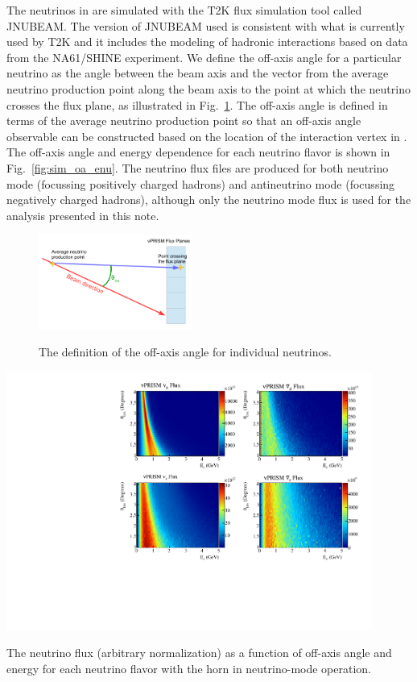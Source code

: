 The neutrinos in \nuprism are simulated with the T2K flux simulation tool called JNUBEAM.  The version of JNUBEAM used is consistent with what is currently used by T2K and it includes the modeling of hadronic interactions based on data from the NA61/SHINE experiment.  We define the off-axis angle for a particular neutrino as the angle between 
the beam axis and the vector from the average neutrino production point along the beam axis to the point
at which the neutrino crosses the flux plane, as illustrated in Fig.~\ref{fig:oa_def}.  The off-axis angle
is defined in terms of the average neutrino production point so that an off-axis angle observable can be
constructed based on the location of the interaction vertex in \nuprism.  The off-axis angle and energy 
dependence for each neutrino flavor is shown in Fig.~\ref{fig:sim_oa_enu}.  The neutrino flux files are produced
for both neutrino mode (focussing positively charged hadrons) and antineutrino mode (focussing negatively 
charged hadrons), although only the neutrino mode flux is used for the analysis presented in this note. 

\begin {figure}[htp]
  \begin{center}
    \includegraphics[width=0.45\textwidth]{figures/oa_definition.pdf}
    \caption{The definition of the off-axis angle for individual neutrinos.}
    \label{fig:oa_def}
  \end{center}
\end {figure}     

\begin {figure*}[htp]
  \begin{center}
    \includegraphics[width=0.9\textwidth]{figures/nuprism_oa_enu.pdf}
    \caption{The neutrino flux (arbitrary normalization) as a function of off-axis angle and energy
for each neutrino flavor with the horn in neutrino-mode operation.}
    \label{fig:sim_oa_enu}
  \end{center}
\end {figure*}  

